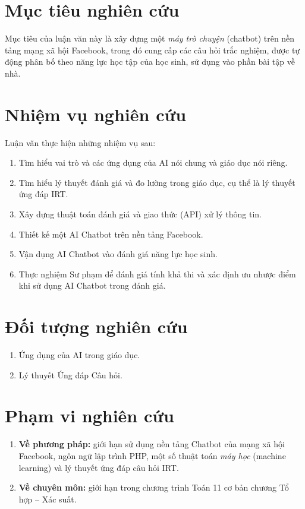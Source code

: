 \section{Mục tiêu nghiên cứu}
Mục tiêu của luận văn này là xây dựng một \textit{máy trò chuyện} (chatbot) trên nền tảng mạng xã hội Facebook, trong đó cung cấp các câu hỏi trắc nghiệm, được tự động phân bố theo năng lực học tập của học sinh, sử dụng vào phần bài tập về nhà.

\section{Nhiệm vụ nghiên cứu}
Luận văn thực hiện những nhiệm vụ sau:\par
\begin{enumerate}[label=\textbf{\thesection.\arabic*.},align=left,left=0cm..1cm]
	\item Tìm hiểu vai trò và các ứng dụng của AI nói chung và giáo dục nói riêng.
	\item Tìm hiểu lý thuyết đánh giá và đo lường trong giáo dục, cụ thể là lý thuyết ứng đáp IRT.
	\item Xây dựng thuật toán đánh giá và giao thức (API) xử lý thông tin.
	\item Thiết kế một AI Chatbot trên nền tảng Facebook.
	\item Vận dụng AI Chatbot vào đánh giá năng lực học sinh.
	\item Thực nghiệm Sư phạm để đánh giá tính khả thi và xác định ưu nhược điểm khi sử dụng AI Chatbot trong đánh giá.
\end{enumerate}\par

\section{Đối tượng nghiên cứu}
\begin{enumerate}[label=\textbf{\thesection.\arabic*.},align=left,left=0cm..1cm]
\item Ứng dụng của AI trong giáo dục.\par
\item Lý thuyết Ứng đáp Câu hỏi.\par
\end{enumerate}

\section{Phạm vi nghiên cứu}
\begin{enumerate}[label=\textbf{\thesection.\arabic*.},align=left,left=0cm..1cm]
	\item \textbf{Về phương pháp:} giới hạn sử dụng nền tảng Chatbot của mạng xã hội Facebook, ngôn ngữ lập trình PHP, một số thuật toán \textit{máy học} (machine learning) và lý thuyết ứng đáp câu hỏi IRT.\par
	\item \textbf{Về chuyên môn:} giới hạn trong chương trình Toán 11 cơ bản chương Tổ hợp – Xác suất.\par
\end{enumerate}

